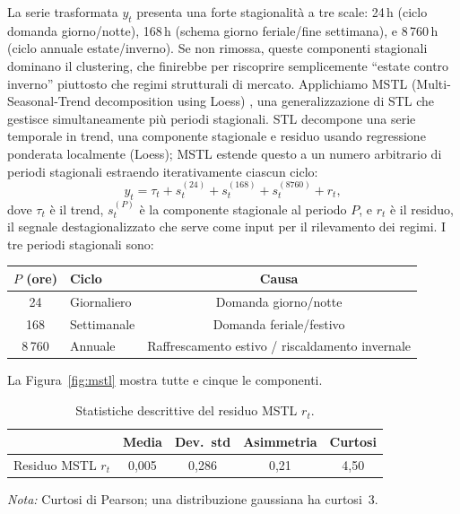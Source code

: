 \documentclass[12pt]{article}
\begin{document}
La serie trasformata $y_t$ presenta una forte stagionalità a tre scale: 24\,h (ciclo domanda giorno/notte), 168\,h (schema giorno feriale/fine settimana), e 8\,760\,h (ciclo annuale estate/inverno).
Se non rimossa, queste componenti stagionali dominano il clustering, che finirebbe per riscoprire semplicemente ``estate contro inverno'' piuttosto che regimi strutturali di mercato.
Applichiamo MSTL (Multi-Seasonal-Trend decomposition using Loess) \citep{bandara2021}, una generalizzazione di STL \citep{cleveland1990} che gestisce simultaneamente più periodi stagionali.
STL decompone una serie temporale in trend, una componente stagionale e residuo usando regressione ponderata localmente (Loess); MSTL estende questo a un numero arbitrario di periodi stagionali estraendo iterativamente ciascun ciclo:
\begin{equation}
y_t = \tau_t + s_t^{(24)} + s_t^{(168)} + s_t^{(8760)} + r_t,
\label{eq:mstl}
\end{equation}
dove $\tau_t$ è il trend, $s_t^{(P)}$ è la componente stagionale al periodo $P$, e $r_t$ è il residuo, il segnale destagionalizzato che serve come input per il rilevamento dei regimi.
I tre periodi stagionali sono:

\begin{table}[H]
\centering
\small
\begin{tabular}{clc}
\toprule
$P$ (ore) & Ciclo & Causa \\
\midrule
24    & Giornaliero & Domanda giorno/notte \\
168   & Settimanale  & Domanda feriale/festivo \\
8\,760 & Annuale  & Raffrescamento estivo / riscaldamento invernale \\
\bottomrule
\end{tabular}
\end{table}
La Figura~\ref{fig:mstl} mostra tutte e cinque le componenti.

\begin{table}[H]
\centering
\caption{Statistiche descrittive del residuo MSTL $r_t$.}
\label{tab:residual_stats}
\begin{tabular}{lcccc}
\toprule
& Media & Dev.\ std & Asimmetria & Curtosi \\
\midrule
Residuo MSTL $r_t$ & 0,005 & 0,286 & 0,21 & 4,50 \\
\bottomrule
\end{tabular}
\par\smallskip
\footnotesize\textit{Nota:} Curtosi di Pearson; una distribuzione gaussiana ha curtosi~3.
\end{table}
\end{document}
